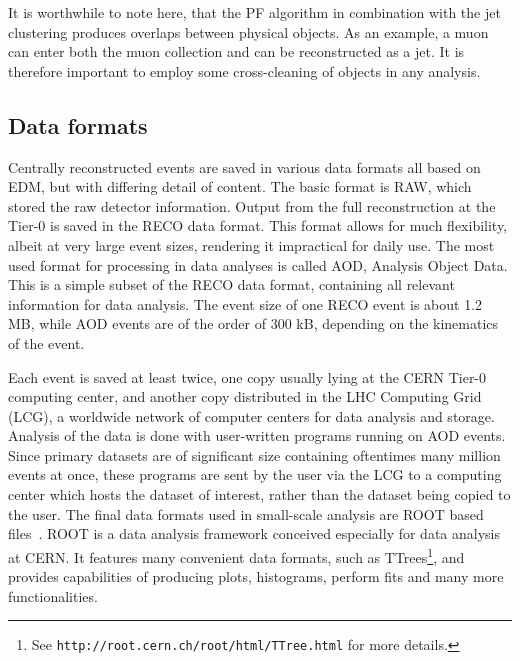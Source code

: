 It is worthwhile to note here, that the PF algorithm in combination with the jet clustering produces overlaps between physical objects. As an example, a muon can enter both the muon
collection and can be reconstructed as a jet. It is therefore important to employ some cross-cleaning of objects in any analysis.

\subsection{Data formats}
Centrally reconstructed events are saved in various data formats all based on EDM, but with differing detail of content. The basic format is RAW, which stored the raw detector information. 
Output from the full reconstruction at the Tier-0 is saved in the RECO data format. This format allows for much flexibility, albeit at very large event sizes, rendering it impractical 
for daily use. The most used format for processing in data analyses is called AOD, Analysis Object Data. This is a simple subset of the RECO data format, containing all relevant information 
for data analysis. The event size of one RECO event is about 1.2 MB, while AOD events are of the order of 300 kB, depending on the kinematics of the event.

Each event is saved at least twice, one copy usually lying at the CERN Tier-0 computing center, and another copy distributed in the LHC Computing Grid (LCG), a worldwide network of computer 
centers for data analysis and storage. Analysis of the data is done with user-written programs running on AOD events. Since primary datasets are of significant size containing oftentimes
many million events at once, these programs are sent by the user via the LCG to a computing center which hosts the dataset of interest, rather than the dataset being copied to the user. The final
data formats used in small-scale analysis are ROOT based files~\cite{root}. ROOT is a data analysis framework conceived especially for data analysis at CERN. It features many convenient 
data formats, such as TTrees\footnote{See \texttt{http://root.cern.ch/root/html/TTree.html} for more details.}, and provides capabilities of producing plots, histograms, perform fits and many 
more functionalities.



